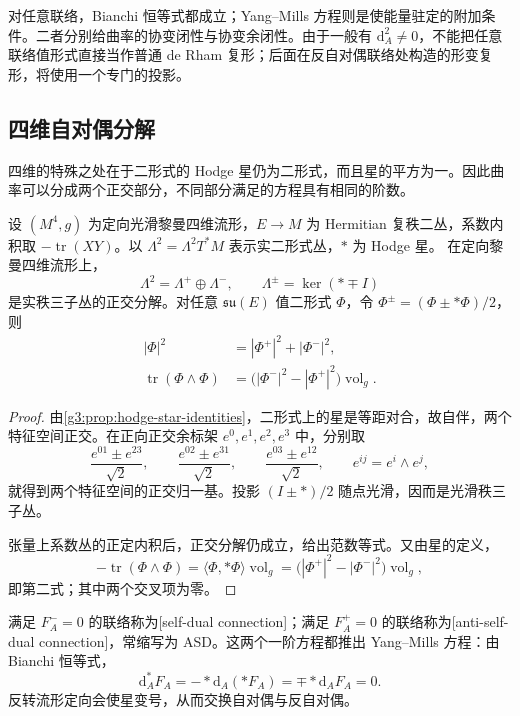 对任意联络，Bianchi 恒等式都成立；Yang--Mills 方程则是使能量驻定的附加条件。二者分别给曲率的协变闭性与协变余闭性。由于一般有
\(\mathrm d_A^2\ne0\)，不能把任意联络值形式直接当作普通 de Rham 复形；后面在反自对偶联络处构造的形变复形，将使用一个专门的投影。

\subsection{四维自对偶分解}
\label{g3:subsec:B01:03}

四维的特殊之处在于二形式的 Hodge 星仍为二形式，而且星的平方为一。因此曲率可以分成两个正交部分，不同部分满足的方程具有相同的阶数。

\begin{proposition}\label{g3:prop:B-self-dual-decomposition}
	设 \((M^4,g)\) 为定向光滑黎曼四维流形，\(E\to M\) 为 Hermitian 复秩二丛，系数内积取 \(-\operatorname{tr}(XY)\)。以 \(\Lambda^2=\Lambda^2T^*M\) 表示实二形式丛，\(*\) 为 Hodge 星。
	在定向黎曼四维流形上，
	\[
		\Lambda^2=\Lambda^+\oplus\Lambda^-,
		\qquad \Lambda^\pm=\ker(*\mp I)
	\]
	是实秩三子丛的正交分解。对任意 \(\mathfrak{su}(E)\) 值二形式 \(\Phi\)，令
	\(\Phi^\pm=(\Phi\pm*\Phi)/2\)，则
	\begin{equation}\label{g3:eq:B-curvature-splitting-identities}
	\begin{aligned}
		|\Phi|^2&=|\Phi^+|^2+|\Phi^-|^2,\\
		\operatorname{tr}(\Phi\wedge\Phi)
		&=\bigl(|\Phi^-|^2-|\Phi^+|^2\bigr)\operatorname{vol}_g.
	\end{aligned}
	\end{equation}
\end{proposition}
\begin{proof}
	由\cref{g3:prop:hodge-star-identities}，二形式上的星是等距对合，故自伴，两个特征空间正交。在正向正交余标架 \(e^0,e^1,e^2,e^3\) 中，分别取
	\[
		\frac{e^{01}\pm e^{23}}{\sqrt2},\qquad
		\frac{e^{02}\pm e^{31}}{\sqrt2},\qquad
		\frac{e^{03}\pm e^{12}}{\sqrt2},
		\qquad e^{ij}=e^i\wedge e^j,
	\]
	就得到两个特征空间的正交归一基。投影 \((I\pm*)/2\) 随点光滑，因而是光滑秩三子丛。

	张量上系数丛的正定内积后，正交分解仍成立，给出范数等式。又由星的定义，
	\[
		-\operatorname{tr}(\Phi\wedge\Phi)
		=\langle\Phi,*\Phi\rangle\operatorname{vol}_g
		=\bigl(|\Phi^+|^2-|\Phi^-|^2\bigr)\operatorname{vol}_g,
	\]
	即第二式；其中两个交叉项为零。
\end{proof}

满足 \(F_A^-=0\) 的联络称为[self-dual connection]；满足 \(F_A^+=0\) 的联络称为[anti-self-dual connection]，常缩写为 ASD。这两个一阶方程都推出 Yang--Mills 方程：由 Bianchi 恒等式，
\[
	\mathrm d_A^*F_A=-*\mathrm d_A(*F_A)
	=\mp *\mathrm d_AF_A=0.
\]
反转流形定向会使星变号，从而交换自对偶与反自对偶。

